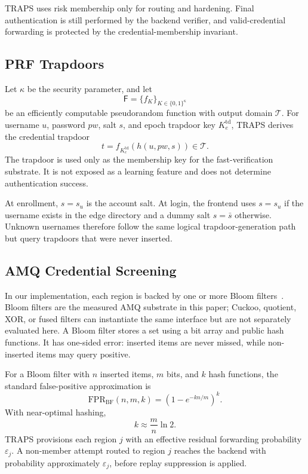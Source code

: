 TRAPS uses risk membership only for routing and hardening. Final authentication is still performed by the backend verifier, and valid-credential forwarding is protected by the credential-membership invariant.

\subsection{PRF Trapdoors}

Let \(\kappa\) be the security parameter, and let
\[
\mathsf{F}=\{f_K\}_{K\in\{0,1\}^{\kappa}}
\]
be an efficiently computable pseudorandom function with output domain \(\mathcal{T}\). For username \(u\), password \(pw\), salt \(s\), and epoch trapdoor key \(K_e^{\mathrm{td}}\), TRAPS derives the credential trapdoor
\[
t
=
f_{K_e^{\mathrm{td}}}
\left(
h(u,pw,s)
\right)
\in\mathcal{T}.
\]
The trapdoor is used only as the membership key for the fast-verification substrate. It is not exposed as a learning feature and does not determine authentication success.

At enrollment, \(s=s_u\) is the account salt. At login, the frontend uses \(s=s_u\) if the username exists in the edge directory and a dummy salt \(s=\bar{s}\) otherwise. Unknown usernames therefore follow the same logical trapdoor-generation path but query trapdoors that were never inserted.

\subsection{AMQ Credential Screening}

In our implementation, each region is backed by one or more Bloom filters~\cite{broder2004network}. Bloom filters are the measured AMQ substrate in this paper; Cuckoo, quotient, XOR, or fused filters can instantiate the same interface but are not separately evaluated here. A Bloom filter stores a set using a bit array and public hash functions. It has one-sided error: inserted items are never missed, while non-inserted items may query positive.

For a Bloom filter with \(n\) inserted items, \(m\) bits, and \(k\) hash functions, the standard false-positive approximation is
\[
\mathrm{FPR}_{\mathrm{BF}}(n,m,k)
=
\left(1-e^{-kn/m}\right)^k.
\]
With near-optimal hashing,
\[
k\approx \frac{m}{n}\ln 2.
\]
TRAPS provisions each region \(j\) with an effective residual forwarding probability \(\varepsilon_j\). A non-member attempt routed to region \(j\) reaches the backend with probability approximately \(\varepsilon_j\), before replay suppression is applied.

